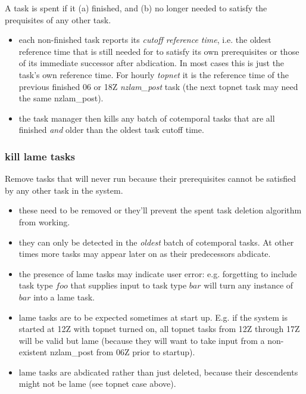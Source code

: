 \documentclass[11pt,a4paper]{report}
\begin{document}
A task is spent if it (a) finished,
    and (b) no longer needed to satisfy the prequisites of any other
    task.
       \begin{itemize}

       \item each non-finished task reports its {\em cutoff reference
       time}, i.e. the oldest reference time that is still needed for to
       satisfy its own prerequisites or those of its immediate successor
       after abdication.  In most cases this is just the task's own
       reference time. For hourly {\em topnet} it is the reference time
       of the previous finished 06 or 18Z {\em nzlam\_post} task (the
       next topnet task may need the same nzlam\_post).  

       \item the task manager then kills any batch of cotemporal tasks
       that are all finished {\em and} older than the oldest task cutoff
       time.

       \end{itemize}

\subsubsection{kill lame tasks} 

Remove tasks that will never run
    because their prerequisites cannot be satisfied by any other task in
    the system.  

       \begin{itemize}
       \item these need to be removed or they'll prevent the spent
       task deletion algorithm from working.
       
       \item they can only be detected in the {\em oldest} batch
       of cotemporal tasks. At other times more tasks may appear later
       on as their predecessors abdicate.

       \item the presence of lame tasks may indicate user error: e.g.
       forgetting to include task type $foo$ that supplies input to
       task type $bar$ will turn any instance of $bar$ into a lame
       task.

       \item lame tasks are to be expected sometimes at start up. E.g.
       if the system is started at 12Z with topnet turned on, all topnet
       tasks from 12Z through 17Z will be valid but lame (because
       they will want to take input from a non-existent nzlam\_post
       from 06Z prior to startup).

       \item lame tasks are abdicated rather than just deleted, because
       their descendents might not be lame (see topnet case above). 
       \end{itemize}
\end{document}

